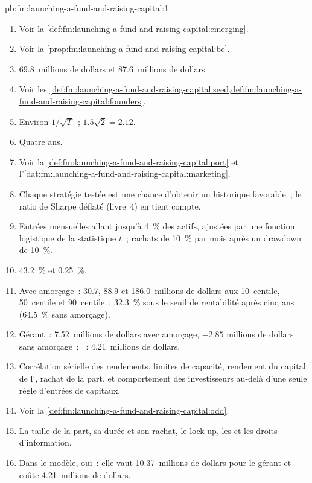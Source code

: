 \begin{solution}{pb:fm:launching-a-fund-and-raising-capital:1}
\begin{enumerate}
\item Voir la \cref{def:fm:launching-a-fund-and-raising-capital:emerging}.
\item Voir la \cref{prop:fm:launching-a-fund-and-raising-capital:be}.
\item 69.8~millions de dollars et 87.6~millions de dollars.
\item Voir les \cref{def:fm:launching-a-fund-and-raising-capital:seed,def:fm:launching-a-fund-and-raising-capital:founders}.
\item Environ $1/\sqrt T$~; $1.5\sqrt2=2.12$.
\item Quatre ans.
\item Voir la \cref{def:fm:launching-a-fund-and-raising-capital:port} et l'\cref{dat:fm:launching-a-fund-and-raising-capital:marketing}.
\item Chaque stratégie testée est une chance d'obtenir un historique favorable~; le ratio de Sharpe déflaté (livre~4) en tient compte.
\item Entrées mensuelles allant jusqu'à 4~\% des actifs, ajustées par une fonction logistique de la statistique $t$~; rachats de 10~\% par mois après un drawdown de 10~\%.
\item 43.2~\% et 0.25~\%.
\item Avec amorçage~: 30.7, 88.9 et 186.0~millions de dollars aux 10~centile, 50~centile et 90~centile~; 32.3~\% sous le seuil de rentabilité après cinq ans (64.5~\% sans amorçage).
\item Gérant~: 7.52~millions de dollars avec amorçage, $-2.85$ millions de dollars sans amorçage~; ~: 4.21~millions de dollars.
\item Corrélation sérielle des rendements, limites de capacité, rendement du capital de l', rachat de la part, et comportement des investisseurs au-delà
d'une seule règle d'entrées de capitaux.
\item Voir la \cref{def:fm:launching-a-fund-and-raising-capital:odd}.
\item La taille de la part, sa durée et son rachat, le lock-up, les  et les droits d'information.
\item Dans le modèle, oui~: elle vaut 10.37~millions de dollars pour le gérant et coûte 4.21~millions de dollars.

\end{enumerate}
\end{solution}
